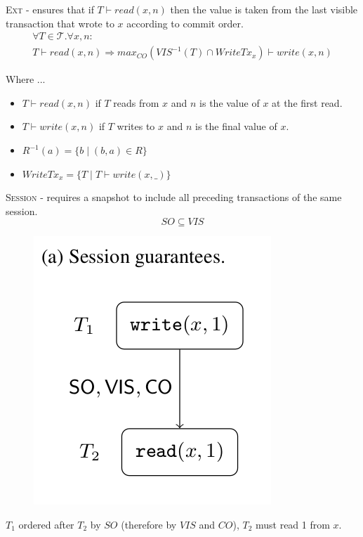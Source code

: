 \documentclass{beamer}
\begin{document}
\begin{frame}
	\begin{definition}
		\textsc{Ext} - ensures that if $T\vdash read(x,n)$ then the value is taken from the last visible transaction that wrote to $x$ according to commit order.
		\begin{multline*}
			\forall T \in \mathcal{T} . \forall x, n: \\
			T \vdash read(x,n) \Rightarrow
			max_{CO}\left( VIS^{-1}\left( T \right) \cap WriteTx_x \right) \vdash write(x,n)
		\end{multline*}
	\end{definition}
	Where ...
	\begin{itemize}
		\item $ T \vdash read(x,n)$ if $T$ reads from $x$ and $n$ is the value of $x$ at the first read.
		\item $ T \vdash write(x,n) $ if $T$ writes to $x$ and $n$ is the final value of $x$.
		\item $R^{-1}(a) = \{ b \mid (b, a) \in R \}$
		\item $ WriteTx_x = \{ T \mid T \vdash write(x,\_)\}$
	\end{itemize}
\end{frame}

\begin{frame}
	\begin{definition}
		\textsc{Session} - requires a snapshot to include all preceding transactions of the same session.
		$$ SO \subseteq VIS $$
	\end{definition}
\end{frame}

\begin{frame}
	\begin{figure}
		\includegraphics[scale=0.3]{fig2a}
	\end{figure}
	\begin{example}
		$T_1$ ordered after $T_2$ by $SO$ (therefore by $VIS$ and $CO$), $T_2$ must read 1 from $x$.
	\end{example}
\end{frame}
\end{document}
